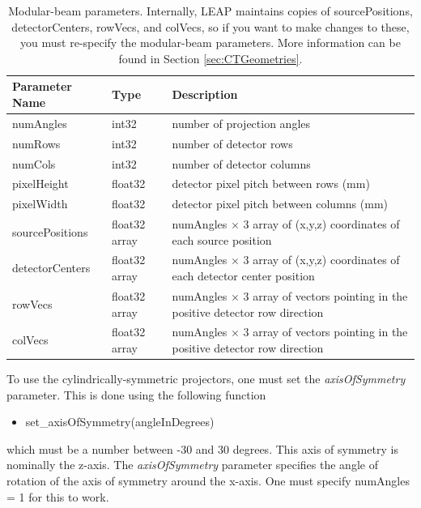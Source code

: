 \documentclass[11pt]{article}
\begin{document}
\begin{table}[h!]
\caption{Modular-beam parameters.  Internally, LEAP maintains copies of sourcePositions, detectorCenters, rowVecs, and colVecs, so if you want to make changes to these, you must re-specify the modular-beam parameters.  More information can be found in Section \ref{sec:CTGeometries}.} \label{tab:modularParameters}
\begin{tabular}{l|l|p{9cm}}
Parameter Name & Type & Description \\
\hline
numAngles & int32 & number of projection angles \\
numRows & int32 & number of detector rows \\
numCols & int32 & number of detector columns \\
pixelHeight & float32 & detector pixel pitch between rows (mm) \\
pixelWidth & float32 & detector pixel pitch between columns (mm) \\
sourcePositions & float32 array & numAngles $\times$ 3 array of (x,y,z) coordinates of each source position \\
detectorCenters & float32 array & numAngles $\times$ 3 array of (x,y,z) coordinates of each detector center position \\
rowVecs & float32 array & numAngles $\times$ 3 array of vectors pointing in the positive detector row direction \\
colVecs & float32 array & numAngles $\times$ 3 array of vectors pointing in the positive detector row direction
\end{tabular}
\end{table}

To use the cylindrically-symmetric projectors, one must set the \textit{axisOfSymmetry} parameter.  This is done using the following function
\begin{itemize}
    \item[] set\_axisOfSymmetry(angleInDegrees)
\end{itemize}
which must be a number between -30 and 30 degrees.  This axis of symmetry is nominally the z-axis.  The \textit{axisOfSymmetry} parameter specifies the angle of rotation of the axis of symmetry around the x-axis.  One must specify numAngles = 1 for this to work.
\end{document}
